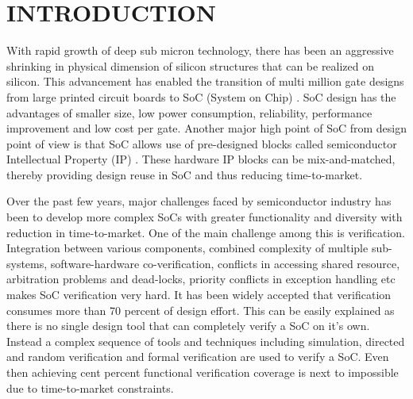 \chapter{INTRODUCTION}

With rapid growth of deep sub micron technology, there has been an aggressive shrinking in physical dimension of silicon structures that can be realized on silicon. This advancement has enabled the transition of multi million gate designs from large printed circuit boards to SoC (System on Chip) . SoC design has the advantages of smaller size, low power consumption, reliability, performance improvement and low cost per gate. Another major high point of SoC from design point of view is that SoC allows use of pre-designed blocks called semiconductor Intellectual Property (IP) . These hardware IP blocks can be mix-and-matched, thereby providing design reuse in SoC and thus reducing time-to-market\cite{ieee:SOC:2010}. 


 Over the past few years, major challenges faced by semiconductor industry has been to develop more complex SoCs with greater functionality and diversity with reduction in time-to-market. One of the main challenge among this is verification\cite{soc}. Integration between various components, combined complexity of multiple sub-systems, software-hardware co-verification, conflicts in accessing shared resource, arbitration problems and dead-locks, priority conflicts in exception handling etc makes SoC verification very hard. It has been widely accepted that verification consumes more than 70 percent of design effort\cite{phd:zhang}. This can be easily explained as there is no single design tool that can completely verify a SoC on it's own. Instead a complex sequence of tools and techniques including simulation, directed and random verification and formal verification are used to verify a SoC. Even then achieving cent percent functional verification coverage is next to impossible due to time-to-market constraints.


